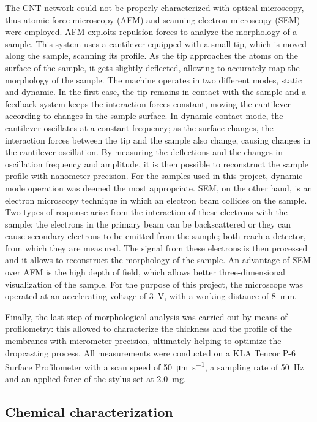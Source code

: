 The CNT network could not be properly characterized with optical microscopy,
thus atomic force microscopy (AFM) and scanning electron microscopy (SEM) were
employed. AFM exploits repulsion forces to analyze the morphology of a sample.
This system uses a cantilever equipped with a small tip, which is moved along
the sample, scanning its profile. As the tip approaches the atoms on the surface
of the sample, it gets slightly deflected, allowing to accurately map the
morphology of the sample. The machine operates in two different modes, static
and dynamic. In the first case, the tip remains in contact with the sample and a
feedback system keeps the interaction forces constant, moving the cantilever
according to changes in the sample surface. In dynamic contact mode, the
cantilever oscillates at a constant frequency; as the surface changes, the
interaction forces between the tip and the sample also change, causing changes
in the cantilever oscillation. By measuring the deflections and the changes in
oscillation frequency and amplitude, it is then possible to reconstruct the
sample profile with nanometer precision. For the samples used in this project,
dynamic mode operation was deemed the most appropriate. SEM, on the other hand,
is an electron microscopy technique in which an electron beam collides on the
sample. Two types of response arise from the interaction of these electrons with
the sample: the electrons in the primary beam can be backscattered or they can
cause secondary electrons to be emitted from the sample; both reach a detector,
from which they are measured. The signal from these electrons is then processed
and it allows to reconstruct the morphology of the sample. An advantage of SEM
over AFM is the high depth of field, which allows better three-dimensional
visualization of the sample. For the purpose of this project, the microscope was
operated at an accelerating voltage of \SI{3}{\V}, with a working distance of
\SI{8}{\mm}.

Finally, the last step of morphological analysis was carried out by means of
profilometry: this allowed to characterize the thickness and the profile of the
membranes with micrometer precision, ultimately helping to optimize the
dropcasting process. All measurements were conducted on a KLA Tencor P-6 Surface
Profilometer with a scan speed of \SI{50}{\um\per\s}, a sampling rate of
\SI{50}{\Hz} and an applied force of the stylus set at \SI{2.0}{\mg}.

\subsection{Chemical characterization}
\label{sec:chemCharacterization}

